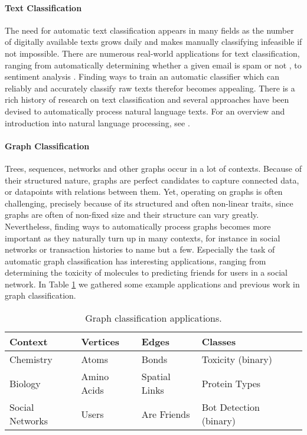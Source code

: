 \paragraph{Text Classification}
The need for automatic text classification appears in many fields as the number of digitally available texts grows daily and makes manually classifying infeasible if not impossible.
There are numerous real-world applications for text classification, ranging from automatically determining whether a given email is spam or not \cite{Yu2008}, to sentiment analysis \cite{Liu2012}.
Finding ways to train an automatic classifier which can reliably and accurately classify raw texts therefor becomes appealing.
There is a rich history of research on text classification and several approaches have been devised to automatically process natural language texts.
For an overview and introduction into natural language processing, see \cite{Manning2000}.

\paragraph{Graph Classification}
Trees, sequences, networks and other graphs occur in a lot of contexts.
Because of their structured nature, graphs are perfect candidates to capture connected data, or datapoints with relations between them.
Yet, operating on graphs is often challenging, precisely because of its structured and often non-linear traits, since graphs are often of non-fixed size and their structure can vary greatly.
Nevertheless, finding ways to automatically process graphs becomes more important as they naturally turn up in many contexts, for instance in social networks or transaction histories to name but a few.
Especially the task of automatic graph classification has interesting applications, ranging from determining the toxicity of molecules to predicting friends for users in a social network.
In Table \ref{table:graph_classification_examples} we gathered some example applications and previous work in graph classification.

\begin{table}[htb!]
\centering
\renewcommand*{\arraystretch}{0.95}
\begin{tabular}{llllr}
\toprule
Context & Vertices & Edges & Classes &  \\
\midrule
Chemistry & Atoms & Bonds & Toxicity (binary) & \cite{Mahe2005} \\
Biology & Amino Acids & Spatial Links & Protein Types & \cite{Vazquez2008} \\ 
Social Networks & Users & Are Friends & Bot Detection (binary) & \cite{Wang2014} \\
\bottomrule
\end{tabular}%
\caption[Table: Graph Classification Applications]{Graph classification applications.}%
\label{table:graph_classification_examples}
\end{table}

